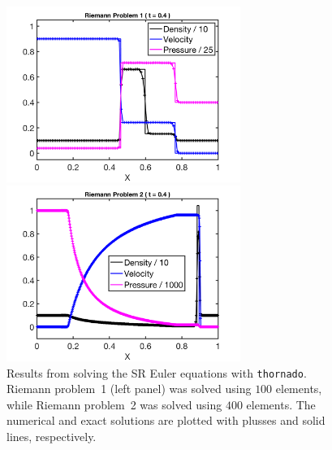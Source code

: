 \documentclass[letterpaper]{jpconf}
\newcommand{\thornado}{\texttt{thornado}}
\begin{document}
\begin{figure}[h]
  \centering
  \begin{minipage}{18pc}
    \includegraphics[width=18pc]{./Figures/MB2005_01_Astronum_2018}
  \end{minipage}\hspace{0.5pc}%
  \begin{minipage}{18pc}
    \includegraphics[width=18pc]{./Figures/MB2005_04_Astronum_2018}
  \end{minipage}
  \caption{\label{fig:RelativisticHydro}Results from solving the SR Euler equations with \thornado.  Riemann problem~1 (left panel) was solved using $100$ elements, while Riemann problem~2 was solved using $400$ elements.  The numerical and exact solutions are plotted with plusses and solid lines, respectively.}
\end{figure}
\end{document}
